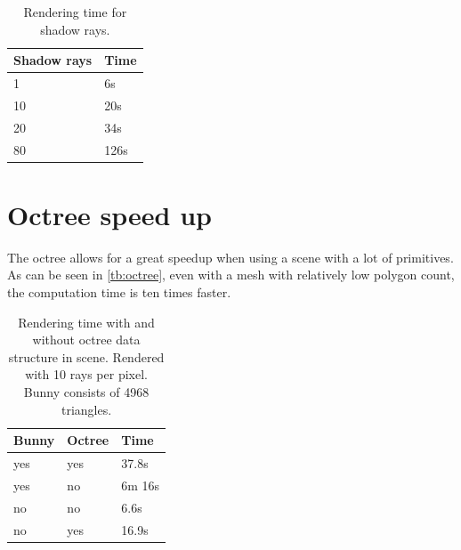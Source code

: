 \documentclass[a4paper, 12pt]{report}
\begin{document}
\begin{table}[h]
\begin{center}

	\begin{tabular}{| l | l |}
		\hline
		Shadow rays & Time \\ \hline
		1 & 6s \\ \hline
		10 & 20s \\ \hline
		20 & 34s \\ \hline
		80 & 126s \\ \hline
	\end{tabular}
	\caption{Rendering time for shadow rays.}
	\label{tb:shadow_rays}
\end{center}
\end{table}

\section{Octree speed up}
The octree allows for a great speedup when using a scene with a lot of primitives.
As can be seen in \autoref{tb:octree}, even with a mesh with relatively low polygon count, the computation time is ten times faster.


\begin{table}[h]
\begin{center}

	\begin{tabular}{| l | l | l |}
		\hline
		Bunny & Octree & Time \\ \hline
		yes & yes & 37.8s \\ \hline
		yes & no & 6m 16s \\ \hline
		no & no & 6.6s \\ \hline
		no & yes & 16.9s \\ \hline
	\end{tabular}
	\caption{Rendering time with and without octree data structure in scene. Rendered with 10 rays per pixel. Bunny consists of 4968 triangles.}
	\label{tb:octree}
\end{center}
\end{table}
\end{document}
